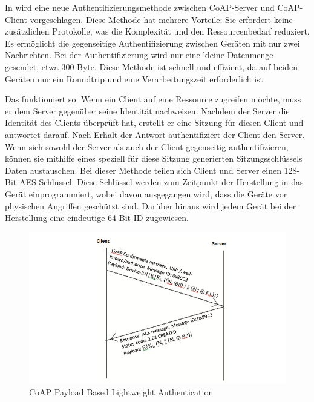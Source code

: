 In \cite{oliver2022lightweight} wird eine neue Authentifizierungsmethode zwischen CoAP-Server und CoAP-Client vorgeschlagen. Diese Methode hat mehrere Vorteile: Sie erfordert keine zusätzlichen Protokolle, was die Komplexität und den Ressourcenbedarf reduziert. Es ermöglicht die gegenseitige Authentifizierung zwischen Geräten mit nur zwei Nachrichten. Bei der Authentifizierung wird nur eine kleine Datenmenge gesendet, etwa 300 Byte. Diese Methode ist schnell und effizient, da auf beiden Geräten nur ein Roundtrip und eine Verarbeitungszeit erforderlich ist\cite{oliver2022lightweight}


Das funktioniert so: Wenn ein Client auf eine Ressource zugreifen möchte, muss er dem Server gegenüber seine Identität nachweisen. Nachdem der Server die Identität des Clients überprüft hat, erstellt er eine Sitzung für diesen Client und antwortet darauf. Nach Erhalt der Antwort authentifiziert der Client den Server. Wenn sich sowohl der Server als auch der Client gegenseitig authentifizieren, können sie mithilfe eines speziell für diese Sitzung generierten Sitzungsschlüssels Daten austauschen. Bei dieser Methode teilen sich Client und Server einen 128-Bit-AES-Schlüssel. Diese Schlüssel werden zum Zeitpunkt der Herstellung in das Gerät einprogrammiert, wobei davon ausgegangen wird, dass die Geräte vor physischen Angriffen geschützt sind. Darüber hinaus wird jedem Gerät bei der Herstellung eine eindeutige 64-Bit-ID zugewiesen.

\begin{figure}[h]
  \centering
  \includegraphics[scale=0.5]{resources/lightCo.png}
 \caption{CoAP Payload Based Lightweight Authentication \cite{oliver2022lightweight}}
  \label{fig:lightCo}
\end{figure}\

